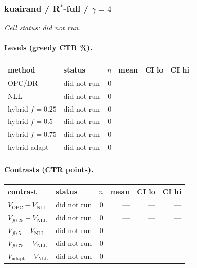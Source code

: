 \documentclass[10pt,a4paper]{article}
\begin{document}
\subsubsection{kuairand / R$^*$-full / $\gamma=4$}
\emph{Cell status: did not run}.
\paragraph{Levels (greedy CTR \%).}
{\centering\small\begin{tabular}{llrrrr}
\toprule method & status & $n$ & mean & CI lo & CI hi \\
\midrule
OPC/DR & did not run & 0 & --- & --- & --- \\
NLL & did not run & 0 & --- & --- & --- \\
hybrid $f{=}0.25$ & did not run & 0 & --- & --- & --- \\
hybrid $f{=}0.5$ & did not run & 0 & --- & --- & --- \\
hybrid $f{=}0.75$ & did not run & 0 & --- & --- & --- \\
hybrid adapt & did not run & 0 & --- & --- & --- \\
\bottomrule\end{tabular}\par}
\paragraph{Contrasts (CTR points).}
{\centering\small\begin{tabular}{llrrrr}
\toprule contrast & status & $n$ & mean & CI lo & CI hi \\
\midrule
$V_{\mathrm{OPC}}-V_{\mathrm{NLL}}$ & did not run & 0 & --- & --- & --- \\
$V_{f0.25}-V_{\mathrm{NLL}}$ & did not run & 0 & --- & --- & --- \\
$V_{f0.5}-V_{\mathrm{NLL}}$ & did not run & 0 & --- & --- & --- \\
$V_{f0.75}-V_{\mathrm{NLL}}$ & did not run & 0 & --- & --- & --- \\
$V_{\mathrm{adapt}}-V_{\mathrm{NLL}}$ & did not run & 0 & --- & --- & --- \\
\bottomrule\end{tabular}\par}
\end{document}
